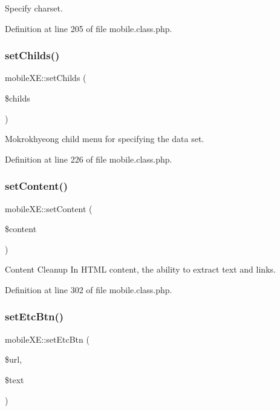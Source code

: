 Specify charset. 



Definition at line 205 of file mobile.\+class.\+php.

\mbox{\label{classmobileXE_a0ea0dec157552b699d23388b257d22a6}} 
\subsubsection{\texorpdfstring{set\+Childs()}{setChilds()}}
{\footnotesize\ttfamily mobile\+X\+E\+::set\+Childs (\begin{DoxyParamCaption}\item[{}]{\$childs }\end{DoxyParamCaption})}



Mokrokhyeong child menu for specifying the data set. 



Definition at line 226 of file mobile.\+class.\+php.

\mbox{\label{classmobileXE_a1f6fe02e3cf472097a66d95b09dfaeae}} 
\subsubsection{\texorpdfstring{set\+Content()}{setContent()}}
{\footnotesize\ttfamily mobile\+X\+E\+::set\+Content (\begin{DoxyParamCaption}\item[{}]{\$content }\end{DoxyParamCaption})}



Content Cleanup In H\+T\+ML content, the ability to extract text and links. 



Definition at line 302 of file mobile.\+class.\+php.

\mbox{\label{classmobileXE_aed1255190e5d085529facbc6f5e79335}} 
\subsubsection{\texorpdfstring{set\+Etc\+Btn()}{setEtcBtn()}}
{\footnotesize\ttfamily mobile\+X\+E\+::set\+Etc\+Btn (\begin{DoxyParamCaption}\item[{}]{\$url,  }\item[{}]{\$text }\end{DoxyParamCaption})}



